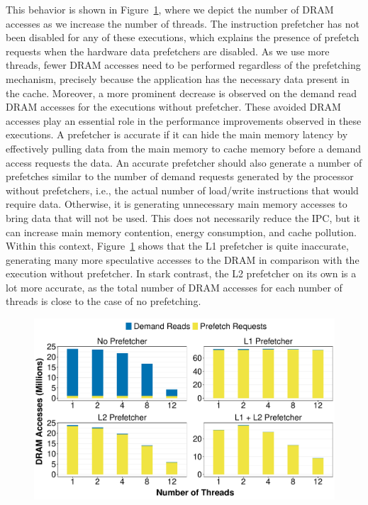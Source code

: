 \documentclass[AMA,final,STIX1COL]{WileyNJD-v2}
\newcommand\new[1]{{\color{red}{#1}}}
\begin{document}
{This behavior is shown in Figure~\ref{fig:drampapi}, where we depict the number of DRAM accesses as we increase the number of threads.
The instruction prefetcher has not been disabled for any of these executions, which explains the presence of prefetch requests when the hardware data prefetchers are disabled.
As we use more threads, fewer DRAM accesses need to be performed regardless of the prefetching mechanism, precisely because the application has the necessary data present in the cache.
Moreover, a more prominent decrease is observed on the demand read DRAM accesses for the executions without prefetcher.
These avoided DRAM accesses play an essential role in the performance improvements observed in these executions.
A prefetcher is accurate if it can hide the main memory latency by effectively pulling data from the main memory to cache memory before a demand access requests the data.
An accurate prefetcher should also generate a number of prefetches similar to the number of demand requests generated by the processor without prefetchers, i.e., the actual number of load/write instructions that would require data.
Otherwise, it is generating unnecessary main memory accesses to bring data that will not be used.
This does not necessarily reduce the IPC, but it can increase main memory contention, energy consumption, and cache pollution.
Within this context, Figure~\ref{fig:drampapi} shows that the L1 prefetcher is quite inaccurate, generating many more speculative accesses to the DRAM in comparison with the execution without prefetcher. 
In stark contrast, the L2 prefetcher on its own is a lot more accurate, as the total number of DRAM accesses for each number of threads is close to the case of no prefetching. 

\begin{figure}[!htb]
    \centering
    \includegraphics[width=.8\linewidth]{figures/dram-accesses-real.pdf}
    \caption{\new{CG main memory accesses, originated by demand reads and prefetches requests, for input class A.}}
    \label{fig:drampapi}
\end{figure}


}
\end{document}
